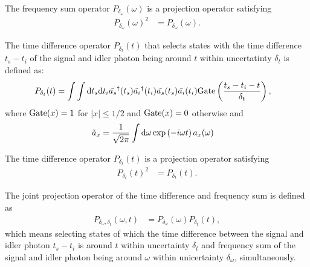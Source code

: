 \documentclass[../../note.tex]{subfiles}
\begin{document}
\begin{lemma}
    The frequency sum operator  $P_{\delta_{\omega}}(\omega)$ is a projection operator satisfying
    \begin{align}
        P_{\delta_{\omega}}(\omega)^2
        &= P_{\delta_{\omega}}(\omega).
    \end{align}
\end{lemma}

\begin{definition}
    The time difference operator $P_{\delta_{t}}(t)$ that selects states with the time difference $t_s - t_i$ of the signal and idler photon being around $t$ within uncertatinty $\delta_{t}$  is defined as:
    \begin{align}
        P_{\delta_{t}}(t)
        &= \int \int {\rm d}t_s{\rm d}t_i \tilde{a_s}^\dagger(t_s) \tilde{a_i}^\dagger(t_i) \tilde{a_s}(t_s) \tilde{a_i}(t_i) {\rm Gate}\left(\frac{t_s -t_i-t}{\delta_{t}}\right),
    \end{align}
    where ${\rm Gate}(x) = 1$ for $\vert x \vert \leq 1/2$ and ${\rm Gate}(x) = 0$ otherwise and 
    \begin{align}
        \tilde{a}_x
        &= \frac{1}{\sqrt{2 \pi}} \int {\rm d}\omega \exp\left(-i\omega t\right)a_x(\omega)
    \end{align}
\end{definition}

\begin{lemma}
    The time difference operator  $P_{\delta_{t}}(t)$ is a projection operator satisfying
    \begin{align}
        P_{\delta_{t}}(t)^2
        &= P_{\delta_{t}}(t).
    \end{align}
\end{lemma}

\begin{definition}
    The joint projection operator of the time difference and frequency sum is defined as
    \begin{align}
        P_{\delta_{\omega}, \delta_t}(\omega, t)
        &= P_{\delta_{\omega}}(\omega) P_{\delta_t}(t),
    \end{align}
    which means selecting states of which the time difference between the signal and idler photon $t_s -t_i$ is around $t$ within uncertainty $\delta_t$ and frequency sum of the signal and idler photon being around $\omega$ within unicertainty $\delta_{\omega}$, simultaneously.
\end{definition}
\end{document}
